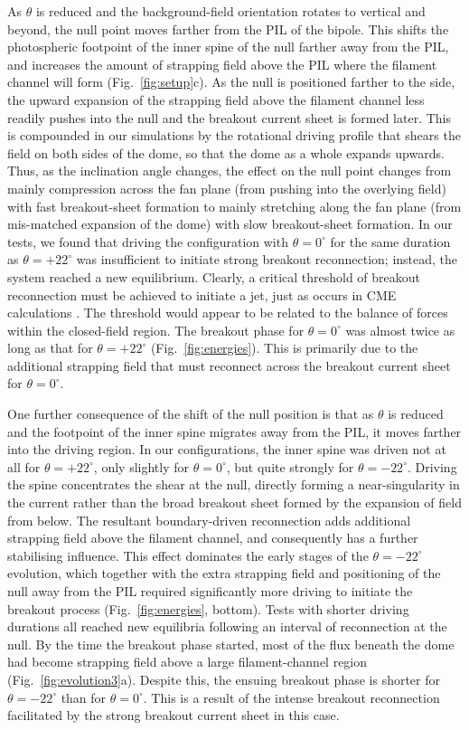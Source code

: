 \documentclass[twocolumn]{aastex6}
\begin{document}
As $\theta$ is reduced and the background-field orientation rotates to vertical and beyond, the null point moves farther from the PIL of the bipole. This shifts the photospheric footpoint of the inner spine of the null farther away from the PIL, and increases the amount of strapping field above the PIL where the filament channel will form (Fig.\ \ref{fig:setup}c). As the null is positioned farther to the side, the upward expansion of the strapping field above the filament channel less readily pushes into the null and the breakout current sheet is formed later. This is compounded in our simulations by the rotational driving profile that shears the field on both sides of the dome, so that the dome as a whole expands upwards. Thus, as the inclination angle changes, the effect on the null point changes from mainly compression across the fan plane (from pushing into the overlying field) with fast breakout-sheet formation to mainly stretching along the fan plane (from mis-matched expansion of the dome) with slow breakout-sheet formation. In our tests, we found that driving the configuration with $\theta = 0^\circ$ for the same duration as $\theta = +22^\circ$ was insufficient to initiate strong breakout reconnection; instead, the system reached a new equilibrium. Clearly, a critical threshold of breakout reconnection must be achieved to initiate a jet, just as occurs in CME calculations \citep[e.g.][]{Karpen2012}. The threshold would appear to be related to the balance of forces within the closed-field region. The breakout phase for $\theta = 0^\circ$ was almost twice as long as that for $\theta = +22^\circ$ (Fig.\ \ref{fig:energies}). This is primarily due to the additional strapping field that must reconnect across the breakout current sheet for $\theta = 0^\circ$. 


One further consequence of the shift of the null position is that as $\theta$ is reduced and the footpoint of the inner spine migrates away from the PIL, it moves farther into the driving region. In our configurations, the inner spine was driven not at all for $\theta = +22^\circ$, only slightly for $\theta = 0^\circ$, but quite strongly for $\theta = -22^\circ$. Driving the spine concentrates the shear at the null, directly forming a near-singularity in the current \citep{Pontin2007,Wyper2014a} rather than the broad breakout sheet formed by the expansion of field from below. The resultant boundary-driven reconnection adds additional strapping field above the filament channel, and consequently has a further stabilising influence. This effect dominates the early stages of the $\theta = -22^\circ$ evolution, which together with the extra strapping field and positioning of the null away from the PIL required significantly more driving to initiate the breakout process (Fig.\ \ref{fig:energies}, bottom). Tests with shorter driving durations all reached new equilibria following an interval of reconnection at the null. By the time the breakout phase started, most of the flux beneath the dome had become strapping field above a large filament-channel region (Fig.\ \ref{fig:evolution3}a). Despite this, the ensuing breakout phase is shorter for $\theta = -22^\circ$ than for $\theta = 0^\circ$. This is a result of the intense breakout reconnection facilitated by the strong breakout current sheet in this case.
\end{document}
